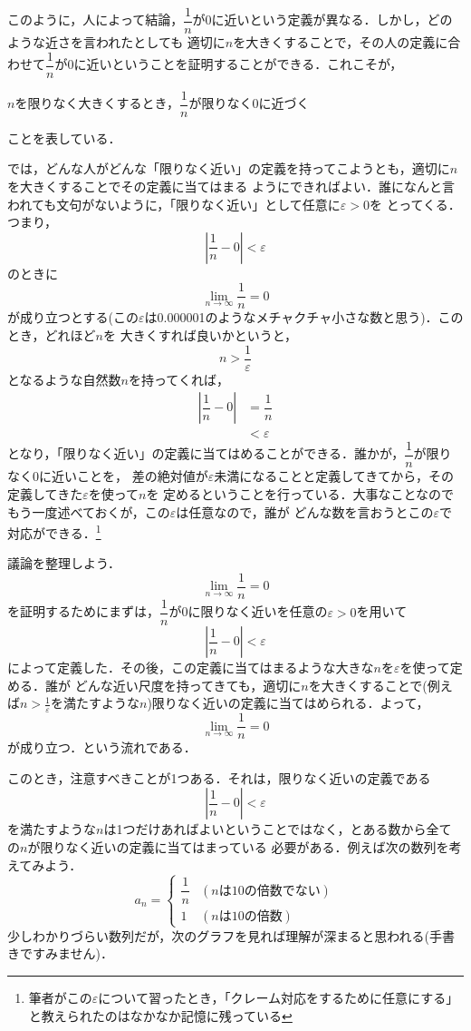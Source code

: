 \documentclass[a4paper,12pt,autodetect-engine,dvipdfmx]{jsarticle}
\theoremstyle{definition}
\begin{document}
このように，人によって結論，$\dfrac{1}{n}$が0に近いという定義が異なる．しかし，どのような近さを言われたとしても
適切に$n$を大きくすることで，その人の定義に合わせて$\dfrac{1}{n}$が0に近いということを証明することができる．これこそが，
\begin{center}
    $n$を限りなく大きくするとき，$\dfrac{1}{n}$が限りなく0に近づく
\end{center}
ことを表している．

では，どんな人がどんな「限りなく近い」の定義を持ってこようとも，適切に$n$を大きくすることでその定義に当てはまる
ようにできればよい．誰になんと言われても文句がないように，「限りなく近い」として任意に$\varepsilon > 0$を
とってくる．つまり，
$$\left|\dfrac{1}{n} - 0 \right| < \varepsilon$$
のときに
$$\lim_{n \to \infty}\dfrac{1}{n}= 0$$
が成り立つとする(この$\varepsilon$は0.000001のようなメチャクチャ小さな数と思う)．このとき，どれほど$n$を
大きくすれば良いかというと，
$$n > \dfrac{1}{\varepsilon}$$
となるような自然数$n$を持ってくれば，
\begin{align*}
    \left|\dfrac{1}{n} - 0\right| &= \dfrac{1}{n}\\
                                  &< \varepsilon
\end{align*}
となり，「限りなく近い」の定義に当てはめることができる．誰かが，$\dfrac{1}{n}$が限りなく0に近いことを，
差の絶対値が$\varepsilon$未満になることと定義してきてから，その定義してきた$\varepsilon$を使って$n$を
定めるということを行っている．大事なことなのでもう一度述べておくが，この$\varepsilon$は任意なので，誰が
どんな数を言おうとこの$\varepsilon$で対応ができる．\footnote{筆者がこの$\varepsilon$について習ったとき，「クレーム対応をするために任意にする」と教えられたのはなかなか記憶に残っている}

議論を整理しよう．
$$\lim_{n \to \infty}\dfrac{1}{n} = 0$$
を証明するためにまずは，$\dfrac{1}{n}$が0に限りなく近いを任意の$\varepsilon > 0$を用いて
$$\left|\dfrac{1}{n} - 0 \right| < \varepsilon$$
によって定義した．その後，この定義に当てはまるような大きな$n$を$\varepsilon$を使って定める．誰が
どんな近い尺度を持ってきても，適切に$n$を大きくすることで(例えば$n > \frac{1}{\varepsilon}$を満たすような$n$)限りなく近いの定義に当てはめられる．よって，
$$\lim_{n \to \infty}\dfrac{1}{n} = 0$$
が成り立つ．という流れである．

このとき，注意すべきことが1つある．それは，限りなく近いの定義である
$$\left|\dfrac{1}{n} - 0 \right| < \varepsilon$$
を満たすような$n$は1つだけあればよいということではなく，とある数から全ての$n$が限りなく近いの定義に当てはまっている
必要がある．例えば次の数列を考えてみよう．
\begin{equation*}
    a_{n} = 
    \begin{cases}
        \dfrac{1}{n} & (nは10の倍数でない)\\
        1 & (nは10の倍数)
    \end{cases}
\end{equation*}
少しわかりづらい数列だが，次のグラフを見れば理解が深まると思われる(手書きですみません)．
\end{document}
